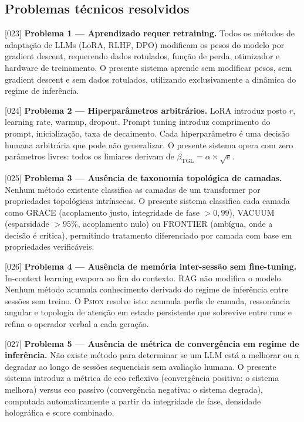 \documentclass[12pt,a4paper]{article}
\newcommand{\betatgl}{\beta_{\text{TGL}}}
\newcommand{\Psion}{\textsc{Psion}}
\begin{document}
\subsection{Problemas técnicos resolvidos}

{[023]} \textbf{Problema 1 --- Aprendizado requer retraining.} Todos os métodos de adaptação de LLMs (LoRA, RLHF, DPO) modificam os pesos do modelo por gradient descent, requerendo dados rotulados, função de perda, otimizador e hardware de treinamento. O presente sistema aprende sem modificar pesos, sem gradient descent e sem dados rotulados, utilizando exclusivamente a dinâmica do regime de inferência.

{[024]} \textbf{Problema 2 --- Hiperparâmetros arbitrários.} LoRA introduz posto $r$, learning rate, warmup, dropout. Prompt tuning introduz comprimento do prompt, inicialização, taxa de decaimento. Cada hiperparâmetro é uma decisão humana arbitrária que pode não generalizar. O presente sistema opera com zero parâmetros livres: todos os limiares derivam de $\betatgl = \alpha \times \sqrt{e}$.

{[025]} \textbf{Problema 3 --- Ausência de taxonomia topológica de camadas.} Nenhum método existente classifica as camadas de um transformer por propriedades topológicas intrínsecas. O presente sistema classifica cada camada como GRACE (acoplamento justo, integridade de fase $> 0{,}99$), VACUUM (esparsidade $> 95\%$, acoplamento nulo) ou FRONTIER (ambígua, onde a decisão é crítica), permitindo tratamento diferenciado por camada com base em propriedades verificáveis.

{[026]} \textbf{Problema 4 --- Ausência de memória inter-sessão sem fine-tuning.} In-context learning evapora ao fim do contexto. RAG não modifica o modelo. Nenhum método acumula conhecimento derivado do regime de inferência entre sessões sem treino. O \Psion{} resolve isto: acumula perfis de camada, ressonância angular e topologia de atenção em estado persistente que sobrevive entre runs e refina o operador verbal a cada geração.

{[027]} \textbf{Problema 5 --- Ausência de métrica de convergência em regime de inferência.} Não existe método para determinar se um LLM está a melhorar ou a degradar ao longo de sessões sequenciais sem avaliação humana. O presente sistema introduz a métrica de eco reflexivo (convergência positiva: o sistema melhora) versus eco passivo (convergência negativa: o sistema degrada), computada automaticamente a partir da integridade de fase, densidade holográfica e score combinado.
\end{document}
